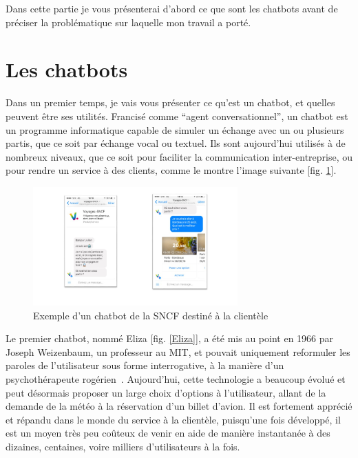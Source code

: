 \documentclass[stage2a]{tnreport} %
\begin{document}
Dans cette partie je vous présenterai d'abord ce que sont les chatbots avant de préciser la problématique sur laquelle mon travail a porté. \\


\section{Les chatbots}

Dans un premier temps, je vais vous présenter ce qu'est un chatbot, et quelles peuvent être ses utilités. Francisé comme ``agent conversationnel'', un chatbot est un programme informatique capable de simuler un échange avec un ou plusieurs partis, que ce soit par échange vocal ou textuel. Ils sont aujourd'hui utilisés à de nombreux niveaux, que ce soit pour faciliter la communication inter-entreprise, ou pour rendre un service à des clients, comme le montre l'image suivante [fig. \ref{chatbot}]. \\

\begin{figure}[h!]
    \centering
    \includegraphics[width=0.7\textwidth]{figures/bot_sncf.png}
    \caption{Exemple d'un chatbot de la SNCF destiné à la clientèle~\cite{BotSNCF}}
    \label{chatbot}
\end{figure}


\vspace{\linewidth}
Le premier chatbot, nommé Eliza [fig. \ref{Eliza}], a été mis au point en 1966 par Joseph Weizenbaum, un professeur au MIT, et pouvait uniquement reformuler les paroles de l'utilisateur sous forme interrogative, à la manière d'un psychothérapeute rogérien~\cite{chatbots}. Aujourd'hui, cette technologie a beaucoup évolué et peut désormais proposer un large choix d'options à l'utilisateur, allant de la demande de la météo à la réservation d'un billet d'avion. Il est fortement apprécié et répandu dans le monde du service à la clientèle, puisqu'une fois développé, il est un moyen très peu coûteux de venir en aide de manière instantanée à des dizaines, centaines, voire milliers d'utilisateurs à la fois. \\
\end{document}
